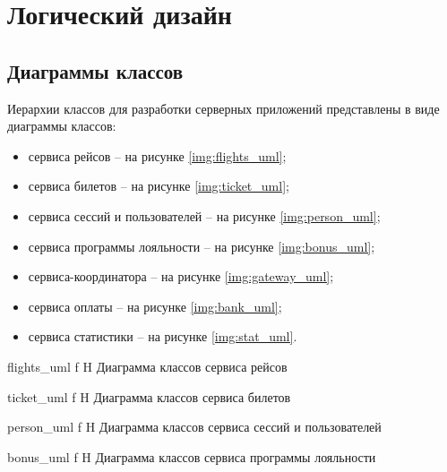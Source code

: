 \section*{Логический дизайн}

\subsection*{Диаграммы классов}

Иерархии классов для разработки серверных приложений представлены в виде диаграммы классов:
\begin{itemize}
    \item сервиса рейсов --  на рисунке \ref{img:flights_uml};
    \item сервиса билетов --  на рисунке \ref{img:ticket_uml};
    \item сервиса сессий и пользователей --  на рисунке \ref{img:person_uml};
    \item сервиса программы лояльности --  на рисунке \ref{img:bonus_uml};
    \item сервиса-координатора --  на рисунке \ref{img:gateway_uml};
    \item сервиса оплаты --  на рисунке \ref{img:bank_uml};
    \item сервиса статистики --  на рисунке \ref{img:stat_uml}.
\end{itemize}


{flights_uml} %
{f} %
{H} %
{\textwidth} %
{Диаграмма классов сервиса рейсов} %

{ticket_uml} %
{f} %
{H} %
{\textwidth} %
{Диаграмма классов сервиса билетов} %


{person_uml} %
{f} %
{H} %
{\textwidth} %
{Диаграмма классов сервиса сессий и пользователей} %


{bonus_uml} %
{f} %
{H} %
{\textwidth} %
{Диаграмма классов сервиса программы лояльности} %


